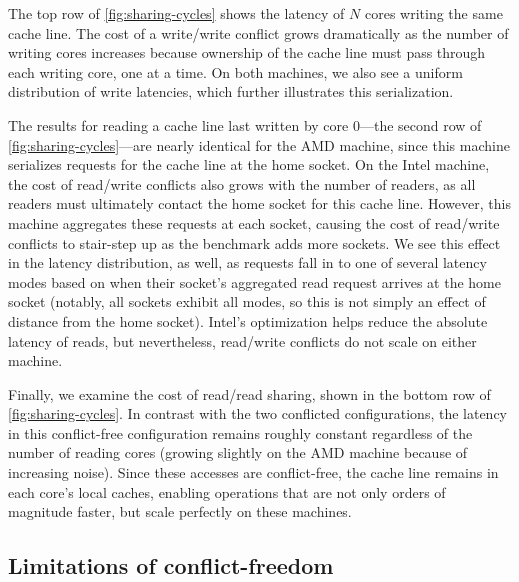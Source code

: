 
The top row of \cref{fig:sharing-cycles} shows the latency of $N$
cores writing the same cache line.  The cost of a write/write conflict
grows dramatically as the number of writing cores increases because
ownership of the cache line must pass through each writing core, one
at a time.  On both machines, we also see a uniform distribution of
write latencies, which further illustrates this serialization.

The results for reading a cache line last written by core 0---the
second row of \cref{fig:sharing-cycles}---are nearly identical for the
AMD machine, since this machine serializes requests for the cache line
at the home socket.  On the Intel machine, the cost of read/write
conflicts also grows with the number of readers, as all readers must
ultimately contact the home socket for this cache line.  However, this
machine aggregates these requests at each socket, causing the cost of
read/write conflicts to stair-step up as the benchmark adds more
sockets.  We see this effect in the latency distribution, as well, as
requests fall in to one of several latency modes based on when their
socket's aggregated read request arrives at the home socket (notably,
all sockets exhibit all modes, so this is not simply an effect of
distance from the home socket).  Intel's optimization helps reduce the
absolute latency of reads, but nevertheless, read/write conflicts do
not scale on either machine.

Finally, we examine the cost of read/read sharing, shown in the bottom
row of \cref{fig:sharing-cycles}.  In contrast with the two conflicted
configurations, the latency in this conflict-free configuration
remains roughly constant regardless of the number of reading cores
(growing slightly on the AMD machine because of increasing noise).
Since these accesses are conflict-free, the cache line remains in each
core's local caches, enabling operations that are not only orders of
magnitude faster, but scale perfectly on these machines.


\subsection{Limitations of conflict-freedom}
\label{sec:scalability:limits}

